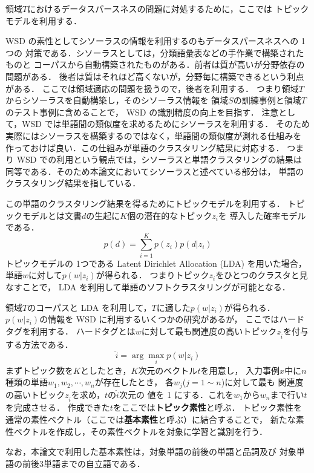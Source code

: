 \documentclass[japanese]{jnlp_1.4}
\begin{document}
領域\( T \)におけるデータスパースネスの問題に対処するために，ここでは
トピックモデルを利用する．

WSD の素性としてシソーラスの情報を利用するのもデータスパースネスへの 1 つの
対策である．シソーラスとしては，分類語彙表などの手作業で構築されたものと
コーパスから自動構築されたものがある．前者は質が高いが分野依存の問題がある．
後者は質はそれほど高くないが，分野毎に構築できるという利点がある．
ここでは領域適応の問題を扱うので，後者を利用する．
つまり領域\( T \)からシソーラスを自動構築し，そのシソーラス情報を
領域\( S \)の訓練事例と領域\( T \)のテスト事例に含めることで，
WSD の識別精度の向上を目指す．
注意として，WSD では単語間の類似度を求めるためにシソーラスを利用する．
そのため実際にはシソーラスを構築するのではなく，単語間の類似度が測れる仕組みを
作っておけば良い．この仕組みが単語のクラスタリング結果に対応する．
つまり WSD での利用という観点では，シソーラスと単語クラスタリングの結果は
同等である．そのため本論文においてシソーラスと述べている部分は，
単語のクラスタリング結果を指している．

この単語のクラスタリング結果を得るためにトピックモデルを利用する．
トピックモデルとは文書\( d \)の生起に\( K \)個の潜在的なトピック\( z_i \)を
導入した確率モデルである．
\[
p(d) = \sum_{i = 1}^{K} p(z_i) p(d |z_i)
\]
トピックモデルの 1つである Latent Dirichlet Allocation (LDA) \cite{blei}を用いた場合，
単語\( w \)に対して\( p(w|z_i) \)が得られる．
つまりトピック\( z_i \)をひとつのクラスタと見なすことで，
LDA を利用して単語のソフトクラスタリングが可能となる．

領域\( T \)のコーパスと LDA を利用して，\( T \)に適した\( p(w|z_i) \)が得られる．
\( p(w|z_i) \)の情報を WSD に利用するいくつかの研究\cite{li,boyd1,boyd2}があるが，
ここではハードタグ\cite{cai}を利用する．
ハードタグとは\( w \)に対して最も関連度の高いトピック\( z_{\hat{i}} \)を付与する方法である．
\[
\hat{i} = \arg \max_{i} p(w|z_i) 
\]
まずトピック数を\( K \)としたとき，\( K \)次元のベクトル\( t \)を用意し，
入力事例\( x \)中に\( n \)種類の単語\( w_1, w_2, \cdots, w_n \)が存在したとき，
各\( w_j \)(\(j = 1 \sim n\))に対して最も
関連度の高いトピック\( z_{\hat{i}} \)を求め，\( t \)の\( \hat{i} \)次元の
値を 1 にする．これを\( w_1 \)から\( w_n \)まで行い\( t \)を完成させる．
作成できた\( t \)をここでは{\bf トピック素性}と呼ぶ．
トピック素性を通常の素性ベクトル（ここでは{\bf 基本素性}と呼ぶ）に結合することで，
新たな素性ベクトルを作成し，その素性ベクトルを対象に学習と識別を行う．

なお，本論文で利用した基本素性は，対象単語の前後の単語と品詞及び
対象単語の前後3単語までの自立語である．
\end{document}
